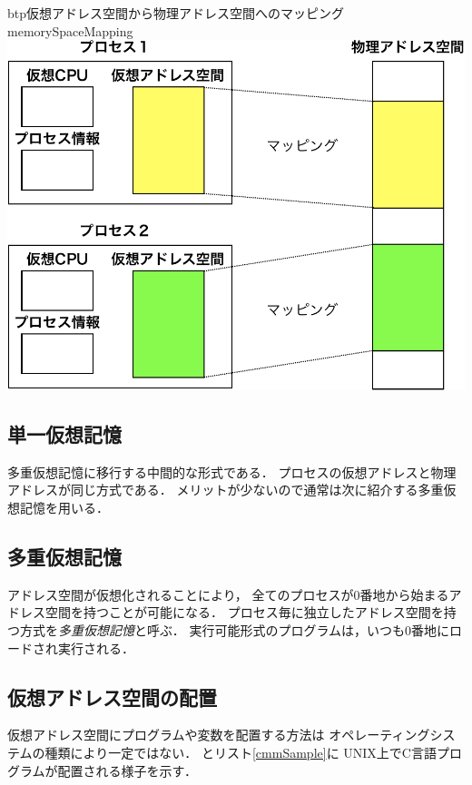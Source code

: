 \begin{myfig}{btp}{仮想アドレス空間から物理アドレス空間へのマッピング}
  {memorySpaceMapping}
  \includegraphics[scale=0.60]{Fig/memorySpaceMapping-crop.pdf}
\end{myfig}

\subsection{単一仮想記憶}
多重仮想記憶に移行する中間的な形式である．
プロセスの仮想アドレスと物理アドレスが同じ方式である．
メリットが少ないので通常は次に紹介する多重仮想記憶を用いる．

\subsection{多重仮想記憶}
アドレス空間が仮想化されることにより，
全てのプロセスが0番地から始まるアドレス空間を持つことが可能になる．
プロセス毎に独立したアドレス空間を持つ方式を\emph{多重仮想記憶}と呼ぶ．
実行可能形式のプログラムは，いつも0番地にロードされ実行される．

\subsection{仮想アドレス空間の配置}
仮想アドレス空間にプログラムや変数を配置する方法は
オペレーティングシステムの種類により一定ではない．
とリスト\ref{cmmSample}に
UNIX上でC言語プログラムが配置される様子を示す．

